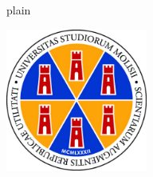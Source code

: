 \documentclass[
11pt, %
oneside, %
english, %
onehalfspacing,%
headsepline, %
]{MastersDoctoralThesis} %
\author{Angelo \textsc{Trotta}} %
\begin{document}
	\renewenvironment{abstract} 
	
	\frontmatter %
	
	\pagestyle{plain} %
	
	
	\begin{titlepage}
		\begin{center}
			
			\includegraphics[width=0.35\textwidth]{figs/logo} %
			
			\vspace{0.75cm}

			{\scshape\huge \univname\par}\vspace{0.15cm} %
			
			{\scshape\Large \deptname\par}\vspace{1cm} %
			
			\\[0.05cm]
			
			\textsc{\Large \degreename}\\[1cm]
			
			\\[0.05cm]
			
			\textsc{\Large \subjectname}\\[1cm] %
			
			{\huge \bfseries \ttitle\par}\vspace{1.5cm} %
			

\end{center}
\end{titlepage}
\end{document}
